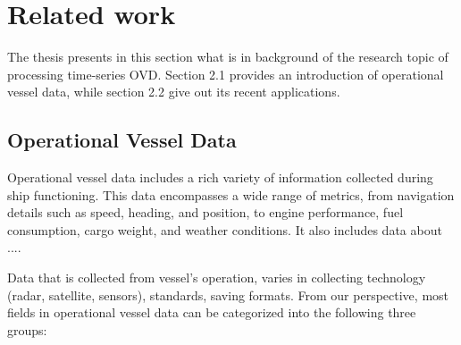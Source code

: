 \chapter{Related work}\label{chap:relatedwork}


The thesis presents in this section what is in background of the research topic of processing time-series OVD. Section 2.1 provides an introduction of operational vessel data, while section 2.2 give out its recent applications. 

\section{Operational Vessel Data}

Operational vessel data includes a rich variety of information collected during ship functioning. This data encompasses a wide range of metrics, from navigation details such as speed, heading, and position, to engine performance, fuel consumption, cargo weight, and weather conditions. It also includes data about .... 

Data that is collected from vessel's operation, varies in collecting technology (radar, satellite, sensors), standards, saving formats. From our perspective, most fields in operational vessel data can be categorized into the following three groups:

